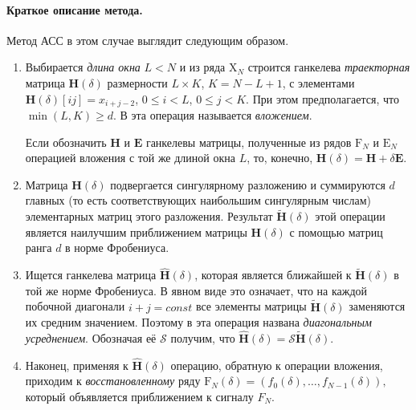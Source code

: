 \documentclass[fleqn]{article}
\begin{document}
\paragraph{Краткое описание метода.}
 Метод АСС в этом случае выглядит следующим образом.
 \begin{enumerate}
 \item
 Выбирается {\it длина окна} $L<N$ и из ряда $\mathrm{X}_N$ строится ганкелева {\it траекторная} матрица $\mathbf{H}(\delta)$ размерности
 $L\times K$, $K=N-L+1$, с элементами $\mathbf{H}(\delta)[ij]=x_{i+j-2}$, $0\leq i<L$, $0\leq j<K$. При этом предполагается, что $\min(L,K)\geq
 d$.
  В \cite{GNZh01} эта операция называется {\it вложением}.

 Если обозначить $\mathbf{H}$ и $\mathbf{E}$ ганкелевы матрицы, полученные из  рядов $\mathrm{F}_N$ и $\mathrm{E}_N$ операцией вложения с той же
 длиной окна $L$, то, конечно,
   ${ \mathbf{H}}(\delta)=\mathbf{H}+\delta \mathbf{E}$.
 \item
 Матрица $\mathbf{H}(\delta)$ подвергается сингулярному разложению и суммируются $d$ главных (то есть соответствующих наибольшим сингулярным
 числам) элементарных матриц этого разложения.  Результат $\widetilde{ \mathbf{H}}(\delta)$ этой операции является наилучшим приближением
 матрицы $\mathbf{H}(\delta)$ с помощью матриц ранга $d$ в норме Фробениуса.
\item
 Ищется ганкелева матрица  $\widehat{ \mathbf{H}}(\delta)$, которая является ближайшей к  $\widetilde{ \mathbf{H}}(\delta)$ в той же норме
 Фробениуса.
 В явном виде это означает, что на каждой побочной диагонали $i+j=const$ все элементы матрицы $\widetilde{ \mathbf{H}}(\delta)$ заменяются их
 средним значением. Поэтому
 в \cite{GNZh01} эта операция названа {\it диагональным усреднением}. Обозначая её $\mathcal{S}$ получим, что   $\widehat{
 \mathbf{H}}(\delta)=\mathcal{S} \widetilde{ \mathbf{H}}(\delta)$.
\item
 Наконец, применяя к $\widehat{ \mathbf{H}}(\delta)$ операцию, обратную к операции вложения, приходим к {\it восстановленному} ряду
 $
 \mathrm{F}_{N}(\delta)=(f_0(\delta),\ldots,f_{N-1}(\delta)),
 $
 который объявляется приближением к сигналу $F_N$.
 \end{enumerate}
\end{document}
